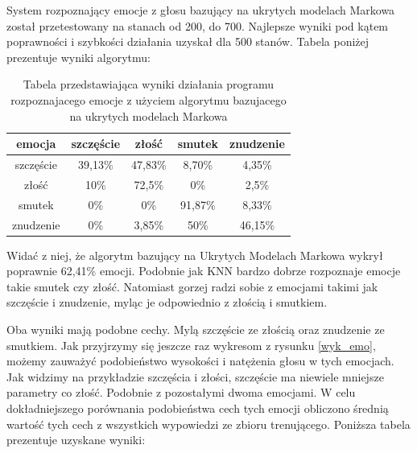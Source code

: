 \documentclass[declaration,shortabstract]{iithesis}
\begin{document}
System rozpoznający emocje z głosu bazujący na ukrytych modelach Markowa został przetestowany na stanach od 200, do 700. Najlepsze wyniki pod kątem poprawności i szybkości działania uzyskał dla 500 stanów. Tabela poniżej prezentuje wyniki algorytmu: 

\begin{table}[t]
\caption{Tabela przedstawiająca wyniki działania programu rozpoznajacego emocje z użyciem algorytmu bazujacego na ukrytych modelach Markowa}
\begin{center}
  \begin{tabular}{| c | c | c | c | c |}
    \hline
    emocja & szczęście & złość & smutek & znudzenie \\ \hline
    szczęście & 39,13\% & 47,83\% & 8,70\% & 4,35\% \\ \hline
	złość & 10\% & 72,5\% & 0\% & 2,5\% \\ \hline
	smutek & 0\% & 0\% & 91,87\% & 8,33\% \\ \hline
	znudzenie & 0\% & 3,85\% & 50\% & 46,15\% \\
    \hline
  \end{tabular}
\end{center}
\end{table}

Widać z niej, że algorytm bazujący na Ukrytych Modelach Markowa wykrył poprawnie 62,41\% emocji. Podobnie jak KNN bardzo dobrze rozpoznaje emocje takie smutek czy złość. Natomiast gorzej radzi sobie z emocjami takimi jak szczęście i znudzenie, myląc je odpowiednio z złością i smutkiem.

Oba wyniki mają podobne cechy. Mylą szczęście ze złością oraz znudzenie ze smutkiem. Jak przyjrzymy się jeszcze raz wykresom z rysunku \ref{wyk_emo}, możemy zauważyć podobieństwo wysokości i natężenia głosu w tych emocjach. Jak widzimy na przykładzie szczęścia i złości, szczęście ma niewiele mniejsze parametry co złość. Podobnie z pozostałymi dwoma emocjami. W celu dokładniejszego porównania podobieństwa cech tych emocji obliczono średnią wartość tych cech z wszystkich wypowiedzi ze zbioru trenującego. Poniższa tabela prezentuje uzyskane wyniki:
\end{document}

